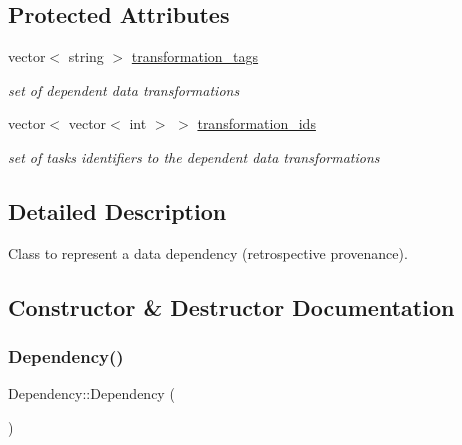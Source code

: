 \subsection*{Protected Attributes}
\begin{DoxyCompactItemize}
\item 
\mbox{\label{classDependency_a080b8391c054aaf43a7a6dfa9d57e125}} 
vector$<$ string $>$ \hyperlink{classDependency_a080b8391c054aaf43a7a6dfa9d57e125}{transformation\+\_\+tags}
\begin{DoxyCompactList}\small\item\em set of dependent data transformations \end{DoxyCompactList}\item 
\mbox{\label{classDependency_a357743c29d1e50ea6a06f0d89e4fa58c}} 
vector$<$ vector$<$ int $>$ $>$ \hyperlink{classDependency_a357743c29d1e50ea6a06f0d89e4fa58c}{transformation\+\_\+ids}
\begin{DoxyCompactList}\small\item\em set of tasks identifiers to the dependent data transformations \end{DoxyCompactList}\end{DoxyCompactItemize}


\subsection{Detailed Description}
Class to represent a data dependency (retrospective provenance). 

\subsection{Constructor \& Destructor Documentation}
\mbox{\label{classDependency_aa92957076c5000d1d3a56073302f1a41}} 
\subsubsection{\texorpdfstring{Dependency()}{Dependency()}}
{\footnotesize\ttfamily Dependency\+::\+Dependency (\begin{DoxyParamCaption}{ }\end{DoxyParamCaption})\hspace{0.3cm}{\ttfamily [inline]}}

